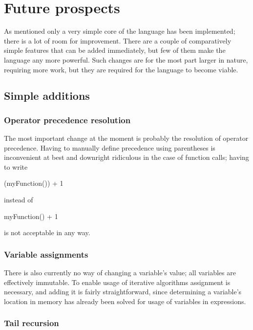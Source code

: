 \chapter{Future prospects}

As mentioned only a very simple core of the language has been implemented; there is a lot of room for improvement. There are a couple of comparatively simple features that can be added immediately, but few of them make the language any more powerful. Such changes are for the most part larger in nature, requiring more work, but they are required for the language to become viable.

    \section{Simple additions}
    
    	\subsection{Operator precedence resolution}
    	
    	The most important change at the moment is probably the resolution of operator precedence. Having to manually define precedence using parentheses is inconvenient at best and downright ridiculous in the case of function calls; having to write
		\begin{perseuslisting}
(myFunction()) + 1
		\end{perseuslisting}
		instead of
		\begin{perseuslisting}
myFunction() + 1
		\end{perseuslisting}
		is not acceptable in any way.
		
		\subsection{Variable assignments}
		
		There is also currently no way of changing a variable's value; all variables are effectively immutable. To enable usage of iterative algorithms assignment is necessary, and adding it is fairly straightforward, since determining a variable's location in memory has already been solved for usage of variables in expressions.
		
		\subsection{Tail recursion}
		
